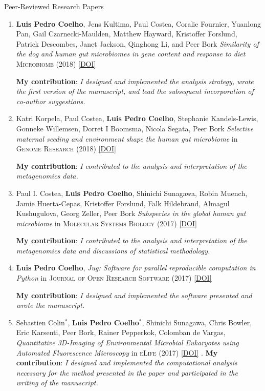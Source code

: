 \documentclass{article}
\renewcommand\subsection[1]{%
    \par\vspace{.1em}%
    {\hspace{1em}\subsubhead #1}%
    \par\vspace{.2em}%
}
\newcommand\showdoi[1]{%
    \href{http://dx.doi.org/#1}{[DOI]}%
}
\newcommand\pubname[1]{\textsc{#1}}
\newcommand\contribution[1]{\relax\hfill\break\textbf{My contribution}: \textit{#1}}
\begin{document}
\medskip
\medskip

\subsection{Peer-Reviewed Research Papers}
\Text

\begin{enumerate}[resume]

\item \textbf{Luis Pedro Coelho}, Jens Kultima, Paul Costea, Coralie Fournier,
Yuanlong Pan, Gail Czarnecki-Maulden, Matthew Hayward, Kristoffer Forslund,
Patrick Descombes, Janet Jackson, Qinghong Li, and Peer Bork \emph{Similarity
of the dog and human gut microbiomes in gene content and response to diet}
\pubname{Microbiome} (2018) \showdoi{10.1186/s40168-018-0450-3}
\contribution{I designed and implemented the analysis strategy, wrote the first
version of the manuscript, and lead the subsequent incorporation of co-author
suggestions.}

\item Katri Korpela, Paul Costea, \textbf{Luis Pedro Coelho}, Stephanie
Kandels-Lewis, Gonneke Willemsen, Dorret I Boomsma, Nicola Segata, Peer Bork
\emph{Selective maternal seeding and environment shape the human gut
microbiome} in \pubname{Genome Research} (2018) \showdoi{10.1101/gr.233940.117}
\contribution{I contributed to the analysis and interpretation of the
metagenomics data.}

\item Paul I. Costea, \textbf{Luis Pedro Coelho}, Shinichi Sunagawa, Robin
Muench, Jamie Huerta-Cepas, Kristoffer Forslund, Falk Hildebrand, Almagul
Kushugulova, Georg Zeller, Peer Bork \emph{Subspecies in the global human gut
microbiome} in \pubname{Molecular Systems Biology} (2017)
\showdoi{10.15252/msb.20177589}
\contribution{I contributed to the analysis and interpretation of the
metagenomics data and discussions of statistical methodology.}

\item \textbf{Luis Pedro Coelho}, \emph{Jug: Software for parallel reproducible
computation in Python} in \pubname{Journal of Open Research
Software} (2017) \showdoi{10.5334/jors.161}
\contribution{I designed and implemented the software presented and wrote the
manuscript.}

\item  Sebastien Colin${}^{*}$, \textbf{Luis Pedro Coelho}${}^{*}$,
Shinichi Sunagawa, Chris Bowler, Eric Karsenti, Peer Bork, Rainer Pepperkok,
Colomban de Vargas, \emph{Quantitative 3D-Imaging of Environmental Microbial
Eukaryotes using Automated Fluorescence Microscopy}
in \pubname{eLife} (2017) \showdoi{10.7554/eLife.26066.001}.
\contribution{I designed and implemented the computational analysis necessary
for the method presented in the paper and participated in the writing of the
manuscript.}


\end{enumerate}
\end{document}
